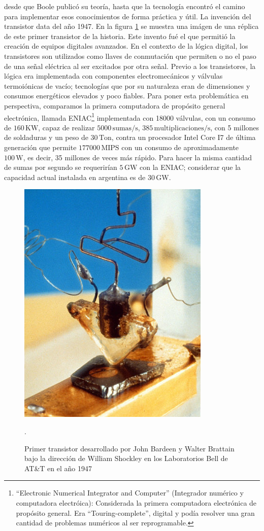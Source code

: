 desde que Boole publicó su teoría, hasta que la tecnología encontró el camino
para implementar esos conocimientos de forma práctica y útil. La invención del
transistor data del año 1947. En la figura \ref{fig:C02-primer_transistor} se
muestra una imágen de una réplica de este primer transistor de la historia. Este
invento fué el que permitió la creación de equipos digitales avanzados. En el
contexto de la lógica digital, los transistores son utilizados como llaves de
conmutación que permiten o no el paso de una señal eléctrica al ser excitados
por otra señal. Previo a los transistores, la lógica era implementada con
componentes electromecánicos y válvulas termoiónicas de vacío; tecnologías que
por su naturaleza eran de dimensiones y consumos energéticos elevados y poco
fiables. Para poner esta problemática en perspectiva, comparamos la primera
computadora de propósito general electrónica, llamada
ENIAC\footnote{``Electronic Numerical Integrator and Computer'' (Integrador
numérico y computadora electróica): Considerada la primera computadora
electrónica de propósito general. Era ``Touring-complete'', digital y podía
resolver una gran cantidad de problemas numéricos al ser reprogramable.}
implementada con 18000 válvulas, con un consumo de $160\,\mathrm{KW}$, capaz de
realizar $5000\,\mathrm{sumas/s}$, $385\,\mathrm{multiplicaciones/s}$, con 5
millones de soldaduras y un peso de $30\,\mathrm{Ton}$, contra un procesador
Intel Core I7 de última generación que permite $177000\,\mathrm{MIPS}$ con un
consumo de aproximadamente $100\,\mathrm{W}$, es decir, 35 millones de veces más
rápido. Para hacer la misma cantidad de sumas por segundo se requerirían
$5\,\mathrm{GW}$ con la ENIAC; considerar que la capacidad actual instalada en
argentina es de $30\,\mathrm{GW}$.
\begin{figure}
  \centering
  \includegraphics[scale=0.5]{./figures/C02-primer_transistor}
  \captionsetup{justification=centering}
  \caption{Primer transistor desarrollado por John Bardeen y Walter 
    Brattain bajo la dirección de William Shockley en los Laboratorios Bell de 
    AT\&T en el año 1947}.
  \label{fig:C02-primer_transistor}
\end{figure}

